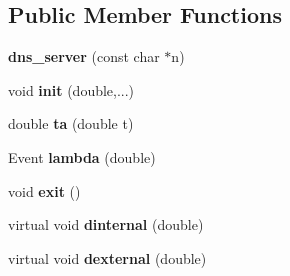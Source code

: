 \subsection*{Public Member Functions}
\begin{DoxyCompactItemize}
\item 
{\bfseries dns\+\_\+server} (const char $\ast$n)\hypertarget{classdns__server_afbeb3f646717cf7960d54385e469b850}{}\label{classdns__server_afbeb3f646717cf7960d54385e469b850}

\item 
void {\bfseries init} (double,...)\hypertarget{classdns__server_a4b17d2d96b3e7a702495b8f44707ec02}{}\label{classdns__server_a4b17d2d96b3e7a702495b8f44707ec02}

\item 
double {\bfseries ta} (double t)\hypertarget{classdns__server_a18ec5017d2e817ddf8d876b3f3f747e5}{}\label{classdns__server_a18ec5017d2e817ddf8d876b3f3f747e5}

\item 
Event {\bfseries lambda} (double)\hypertarget{classdns__server_ad691a03c4bfb71509b3043560c6b73b0}{}\label{classdns__server_ad691a03c4bfb71509b3043560c6b73b0}

\item 
void {\bfseries exit} ()\hypertarget{classdns__server_a05eb620b2f8308ec3818cf5412669890}{}\label{classdns__server_a05eb620b2f8308ec3818cf5412669890}

\item 
virtual void {\bfseries dinternal} (double)\hypertarget{classdns__server_a51e296892a2de8776c83689f172a0797}{}\label{classdns__server_a51e296892a2de8776c83689f172a0797}

\item 
virtual void {\bfseries dexternal} (double)\hypertarget{classdns__server_a3a6cdeea496be969d034af8a0bdb893f}{}\label{classdns__server_a3a6cdeea496be969d034af8a0bdb893f}

\end{DoxyCompactItemize}
